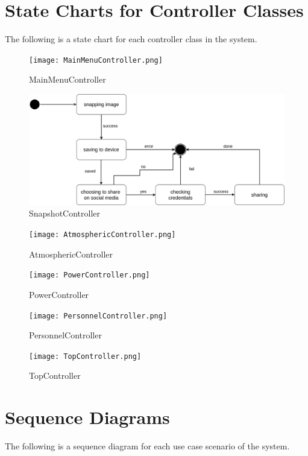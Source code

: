 \documentclass[]{article}
\begin{document}
\section{State Charts for Controller Classes}
\label{sec:state_charts_for_controller_classes}

The following is a state chart for each controller class in the system.

\begin{figure}[H]
	\centering
	\texttt{[image: MainMenuController.png]}
	\caption{MainMenuController}
\end{figure}
\begin{figure}[H]
	\centering
	\includegraphics[width=150mm]{SnapshotController.png}
	\caption{SnapshotController}
\end{figure}
\begin{figure}[H]
	\centering
	\texttt{[image: AtmosphericController.png]}
	\caption{AtmosphericController}
\end{figure}
\begin{figure}[H]
	\centering
	\texttt{[image: PowerController.png]}
	\caption{PowerController}
\end{figure}
\begin{figure}[H]
	\centering
	\texttt{[image: PersonnelController.png]}
	\caption{PersonnelController}
\end{figure}
\begin{figure}[H]
	\centering
	\texttt{[image: TopController.png]}
	\caption{TopController}
\end{figure}


\section{Sequence Diagrams}
\label{sec:sequence_diagrams}
The following is a sequence diagram for each use case scenario of the system.
\end{document}
